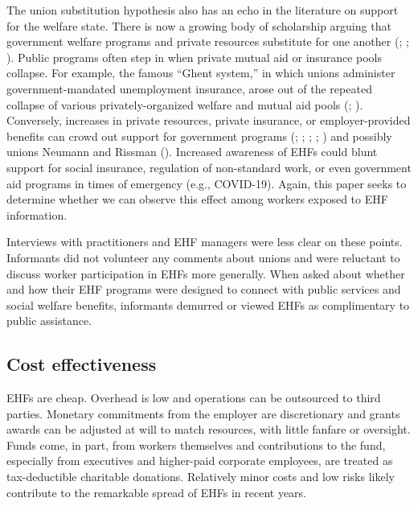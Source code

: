 \documentclass[
  11pt,
  oneside]{article}
\begin{document}
The union substitution hypothesis also has an echo in the literature on support for the welfare state. There is now a growing body of scholarship arguing that government welfare programs and private resources substitute for one another (; ; ). Public programs often step in when private mutual aid or insurance pools collapse. For example, the famous ``Ghent system,'' in which unions administer government-mandated unemployment insurance, arose out of the repeated collapse of various privately-organized welfare and mutual aid pools (; ). Conversely, increases in private resources, private insurance, or employer-provided benefits can crowd out support for government programs (; ; ; ; ) and possibly unions Neumann and Rissman (). Increased awareness of EHFs could blunt support for social insurance, regulation of non-standard work, or even government aid programs in times of emergency (e.g., COVID-19). Again, this paper seeks to determine whether we can observe this effect among workers exposed to EHF information.

Interviews with practitioners and EHF managers were less clear on these points. Informants did not volunteer any comments about unions and were reluctant to discuss worker participation in EHFs more generally. When asked about whether and how their EHF programs were designed to connect with public services and social welfare benefits, informants demurred or viewed EHFs as complimentary to public assistance.

\subsection{Cost effectiveness}\label{cost-effectiveness}

EHFs are cheap. Overhead is low and operations can be outsourced to third parties. Monetary commitments from the employer are discretionary and grants awards can be adjusted at will to match resources, with little fanfare or oversight. Funds come, in part, from workers themselves and contributions to the fund, especially from executives and higher-paid corporate employees, are treated as tax-deductible charitable donations. Relatively minor costs and low risks likely contribute to the remarkable spread of EHFs in recent years.
\end{document}
